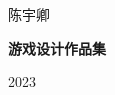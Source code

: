 \begin{titlepage}
   \begin{flushleft}
       \vspace*{3.5cm}

       \Large{陈宇卿}

       \vspace{1.5cm}
       \textbf{\Huge{\color{myred}游戏设计作品集}}
            
       \vspace{1cm}

       \Large{2023}

       \vfill
            
   \end{flushleft}
\end{titlepage}